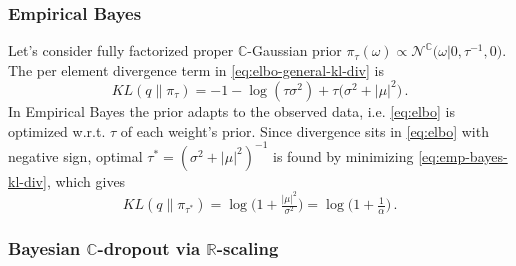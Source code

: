 \documentclass[a4paper,10pt]{article}
\newcommand{\real}{\mathbb{R}}
\newcommand{\cplx}{\mathbb{C}}
\newcommand{\tr}[1]{\mathop{tr}{#1}}
\begin{document}

\subsubsection{Empirical Bayes} %
\label{ssub:empirical_bayes}

Let's consider fully factorized proper $\cplx$-Gaussian prior $
  \pi_\tau(\omega)
    \propto \mathcal{N}^{\cplx}\bigl(
      \omega \vert 0, \tau^{-1}, 0
    \bigr)
$. The per element divergence term in \eqref{eq:elbo-general-kl-div} is
\begin{equation}  \label{eq:emp-bayes-kl-div}
  KL(q \| \pi_\tau)
    = - 1 - \log{(\tau \sigma^2)}
      + \tau \bigl(
        \sigma^2 + \lvert \mu \rvert^2
      \bigr)
    \,.
\end{equation}
%
%
In Empirical Bayes the prior adapts to the observed data, i.e. \eqref{eq:elbo} is optimized
w.r.t. $\tau$ of each weight's prior. Since divergence sits in \eqref{eq:elbo} with negative
sign, optimal $
  \tau^\ast = (\sigma^2 + \lvert \mu \rvert^2)^{-1}
$ is found by minimizing \eqref{eq:emp-bayes-kl-div}, which gives
\begin{equation}  \label{eq:emp-bayes-opt-kl}
  KL(q \| \pi_{\tau^\ast})
    = \log{\bigl(1 + \tfrac{\lvert \mu \rvert^2}{\sigma^2}\bigr)}
    = \log{\bigl(1 + \tfrac1\alpha \bigr)}
    \,.
\end{equation}


\subsubsection{Bayesian $\cplx$-dropout via $\real$-scaling} %
\label{ssub:real_scaling_dropout}
\end{document}
